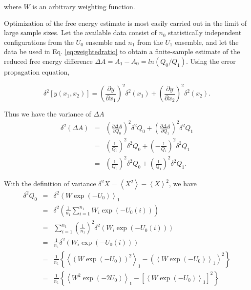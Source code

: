 where $W$ is an arbitrary weighting function.

Optimization of the free energy estimate is most easily carried out in the limit of large sample sizes. Let the available data consist
of $n_{0}$ statistically independent configurations from the $U_{0}$ ensemble and $n_{1}$ from the $U_{1}$ ensemble, and let the data
be used in Eq. \ref{eq:weightedratio} to obtain a finite-sample estimate of the reduced free energy difference $\Delta A=A_{1}-A_{0}=ln(Q_{0}/Q_{1})$.
Using the error propagation equation,

\begin{equation}
	\delta^2\left[y(x_{1},x_{2})\right]=\left(\frac{\partial y}{\partial x_{1}}\right)^{2}\delta^2(x_{1})+\left(\frac{\partial y}{\partial x_{2}}\right)^{2}\delta^2(x_{2}).
\end{equation}

Thus we have the variance of $\Delta A$
\begin{eqnarray}
	\delta^2(\Delta A) & = & \left(\frac{\partial\Delta A}{\partial Q_{0}}\right)^{2}\delta^2Q_0+\left(\frac{\partial\Delta A}{\partial Q_{1}}\right)^{2}\delta^2Q_1\\
	& = & (\frac{1}{Q_{0}})^{2}\delta^2Q_0+(-\frac{1}{Q_{1}})^{2}\delta^2Q_1\\
	& = & (\frac{1}{Q_{0}})^{2}\delta^2Q_0+(\frac{1}{Q_{1}})^{2}\delta^2Q_1.
\end{eqnarray}

With the definition of variance $\delta^2X=\left\langle X^{2}\right\rangle -\left\langle X\right\rangle ^{2}$,
we have 
\begin{eqnarray}
	\delta^2Q_0 & = & \delta^2\left\langle W\exp{(-U_{0})}\right\rangle_{1}\\
	& = & \delta^2\left(\frac{1}{n_1}\sum_{i=1}^{n_1}W_{i}\exp{\left(-U_{0}(i)\right)}\right)\\
	& = & \sum_{i=1}^{n_{1}}\left(\frac{1}{n_{1}}\right)^{2}\delta^2\left(W_{i}\exp{\left(-U_{0}(i)\right)}\right)\\
	& = & \frac{1}{n_{1}}\delta^2\left(W_{i}\exp{\left(-U_{0}(i)\right)}\right)\\
	& = & \frac{1}{n_{1}}\left\{ \left\langle \left(W\exp{(-U_{0})}\right)^{2}\right\rangle _{1}-\left(\left\langle W\exp{(-U_{0})}\right\rangle _{1}\right)^{2}\right\} \\
	& = & \frac{1}{n_{1}}\left\{ \left\langle W^{2}\exp{(-2U_{0})}\right\rangle _{1}-\left[\left\langle W\exp{(-U_{0})}\right\rangle _{1}\right]^{2}\right\} 
\end{eqnarray}

